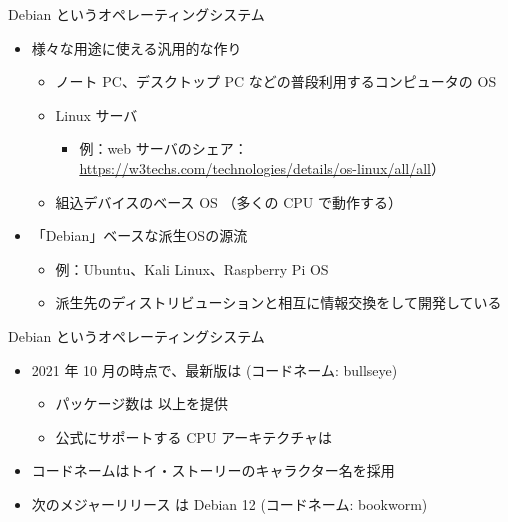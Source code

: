 \begin{frame}{Debian というオペレーティングシステム}

\begin{itemize}
\item 様々な用途に使える汎用的な作り
  \begin{itemize}
  \item ノート PC、デスクトップ PC などの普段利用するコンピュータの OS
  \item Linux サーバ
    \begin{itemize}
    \item 例：web サーバのシェア：\url{https://w3techs.com/technologies/details/os-linux/all/all}）
    \end{itemize}
  \item 組込デバイスのベース OS （多くの CPU で動作する）
  \end{itemize}
\item 「Debian」ベースな派生OSの源流
  \begin{itemize}
  \item 例：Ubuntu、Kali Linux、Raspberry Pi OS
  \item 派生先のディストリビューションと相互に情報交換をして開発している
  \end{itemize}
\end{itemize}

\end{frame}


\begin{frame}{Debian というオペレーティングシステム}
\
  \begin{itemize}
  \item 2021 年 10 月の時点で、最新版は {\color{red}{Debian 11.1}} (コードネーム: bullseye)
    \begin{itemize}
    \item パッケージ数は {\color{red}{約59,551}} 以上を提供
    \item 公式にサポートする CPU アーキテクチャは {\color{red}{9}}
    \end{itemize}
  \item コードネームはトイ・ストーリーのキャラクター名を採用
  \item 次のメジャーリリース は Debian 12 (コードネーム: {\color{red}{}}bookworm)
\end{itemize}

\end{frame}


